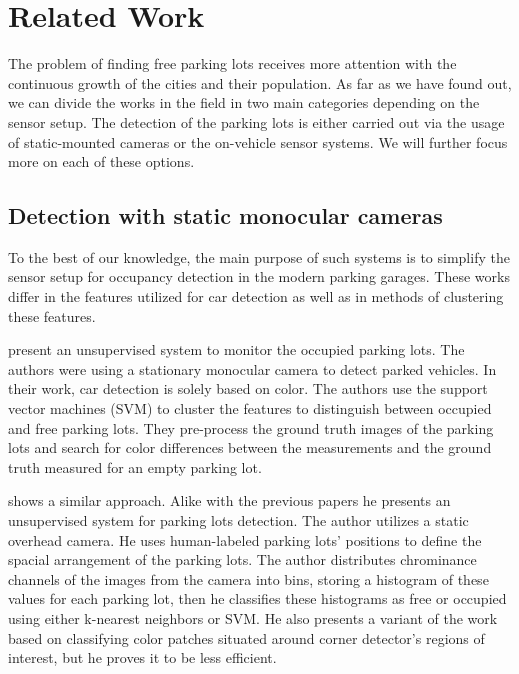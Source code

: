 \chapter{Related Work}
\label{cha:related_works}

The problem of finding free parking lots receives more attention with the
continuous growth of the cities and their population. As far as we have found
out, we can divide the works in the field in two main categories depending on
the sensor setup. The detection of the parking lots is either carried out via
the usage of static-mounted cameras or the on-vehicle sensor systems. We will
further focus more on each of these options.

\section{Detection with static monocular cameras} %
\label{sec:detection_with_monocular_cameras}

To the best of our knowledge, the main purpose of such systems is to simplify
the sensor setup for occupancy detection in the modern parking garages. These
works differ in the features utilized for car detection as well as in methods
of clustering these features.

\citet{qizhang06} present an unsupervised system to monitor the occupied
parking lots. The authors were using a stationary monocular camera to detect
parked vehicles. In their work, car detection is solely based on color. The
authors use the support vector machines (SVM) to cluster the features to
distinguish between occupied and free parking lots. They pre-process the
ground truth images of the parking lots and search for color differences
between the measurements and the ground truth measured for an empty parking
lot.

\citet{nicolastrue} shows a similar approach. Alike with the previous papers
he presents an unsupervised system for parking lots detection. The author
utilizes a static overhead camera. He uses human-labeled parking lots'
positions to define the spacial arrangement of the parking lots. The author
distributes chrominance channels of the images from the camera into bins,
storing a histogram of these values for each parking lot, then he classifies
these histograms as free or occupied using either k-nearest neighbors or
SVM\@. He also presents a variant of the work based on classifying color
patches situated around corner detector's regions of interest, but he proves
it to be less efficient.

